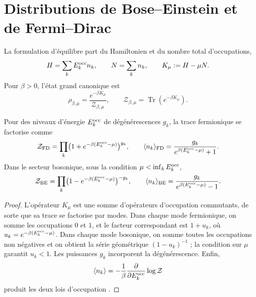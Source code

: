 \section{Distributions de Bose--Einstein et de Fermi--Dirac}
\label{v:v:rec:ocupacion:section:02}

La formulation d’équilibre part du Hamiltonien et du nombre total
d’occupations,
\begin{equation}
 H=\sum_kE_k^{\rm occ} n_k,
 \qquad
 N=\sum_k n_k,
 \qquad
 K_\mu:=H-\mu N.
 \label{v:v:rec:eq:hamiltoniano-gran-canonico-rev3}
\end{equation}
Pour \(\beta>0\), l’état grand canonique est
\begin{equation}
 \rho_{\beta,\mu}
 =\frac{e^{-\beta K_\mu}}{\mathcal Z_{\beta,\mu}},
 \qquad
 \mathcal Z_{\beta,\mu}
 =\operatorname{Tr}(e^{-\beta K_\mu}).
 \label{v:v:rec:eq:estado-gran-canonico-rev3}
\end{equation}

\begin{theorem}
\label{v:v:rec:thm:factorizacion-gran-canonica-rev3}
Pour des niveaux d’énergie \(E_k^{\rm occ}\) de dégénérescences \(g_k\), la
trace fermionique se factorise comme
\begin{equation}
 \mathcal Z_{\rm FD}
 =\prod_k\bigl(1+e^{-\beta(E_k^{\rm occ}-\mu)}\bigr)^{g_k},
 \qquad
 \langle n_k\rangle_{\rm FD}
 =\frac{g_k}{e^{\beta(E_k^{\rm occ}-\mu)}+1}.
 \label{v:v:rec:eq:factorizacion-fd-rev3}
\end{equation}
Dans le secteur bosonique, sous la condition
\(\mu<\inf_kE_k^{\rm occ}\),
\begin{equation}
 \mathcal Z_{\rm BE}
 =\prod_k\bigl(1-e^{-\beta(E_k^{\rm occ}-\mu)}\bigr)^{-g_k},
 \qquad
 \langle n_k\rangle_{\rm BE}
 =\frac{g_k}{e^{\beta(E_k^{\rm occ}-\mu)}-1}.
 \label{v:v:rec:eq:factorizacion-be-rev3}
\end{equation}
\end{theorem}

\begin{proof}
L’opérateur \(K_\mu\) est une somme d’opérateurs d’occupation commutants, de
sorte que sa trace se factorise par modes. Dans chaque mode fermionique, on somme les
occupations \(0\) et \(1\), et le facteur correspondant est
\(1+u_k\), où
\(u_k=e^{-\beta(E_k^{\rm occ}-\mu)}\). Dans chaque mode bosonique, on somme toutes
les occupations non négatives et on obtient la série géométrique
\((1-u_k)^{-1}\) ; la condition sur \(\mu\) garantit \(u_k<1\). Les
puissances \(g_k\) incorporent la dégénérescence. Enfin,
\[
 \langle n_k\rangle
 =-\frac1\beta\frac{\partial}{\partial E_k^{\rm occ}}
   \log\mathcal Z
\]
produit les deux lois d’occupation
\cite{v:Bose1924,v:Einstein1924,v:Fermi1926,v:Dirac1926,v:Pathria2011}.
\end{proof}

